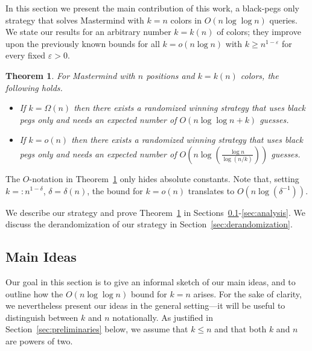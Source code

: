 \documentclass[english,a4paper,11pt]{article}
\newcommand{\eps}{{\varepsilon}}
\newtheorem{theorem}{Theorem}
\begin{document}
{In this section we present the main contribution of this work, a black-pegs only strategy that solves Mastermind with $k=n$ colors in $O(n\log\log n)$ queries. We state our results for an arbitrary number $k=k(n)$ of colors; they improve upon the previously known bounds for all $k=o(n\log n)$ with $k\geq n^{1-\eps}$ for every fixed $\eps>0$.  



\begin{theorem}
\label{thm:main} For Mastermind with $n$ positions and $k=k(n)$ colors, the following holds.
\begin{itemize}
\item If $k= \Omega(n)$ then there exists a randomized winning strategy that uses black pegs only and needs an expected number of $O(n \log \log n + k)$ guesses. 
\item If $k= o(n)$ then there exists a randomized winning strategy that uses black pegs only and needs an expected number of $O\left(n \log \left(\frac{\log n}{\log (n/k)}\right)\right)$ guesses. 
\end{itemize}
\end{theorem}
The $O$-notation in Theorem~\ref{thm:main} only hides absolute constants. Note that, setting $k=:n^{1-\delta}$, $\delta=\delta(n)$, the bound for $k=o(n)$ translates to $O(n\log(\delta^{-1}))$. 

We describe our strategy and prove Theorem~\ref{thm:main} in Sections~\ref{sec:ideas}-\ref{sec:analysis}. We discuss the derandomization of our strategy in Section~\ref{sec:derandomization}.




\subsection{Main Ideas} 
\label{sec:ideas}
Our goal in this section is to give an informal sketch of our main ideas, and to outline how the $O(n\log\log n)$ bound for $k=n$ arises. For the sake of clarity, we nevertheless present our ideas in the general setting---it will be useful to distinguish between $k$ and $n$ notationally. As justified in Section~\ref{sec:preliminaries} below, we assume that $k\leq n$ and that both $k$ and $n$ are powers of two.

}
\end{document}
